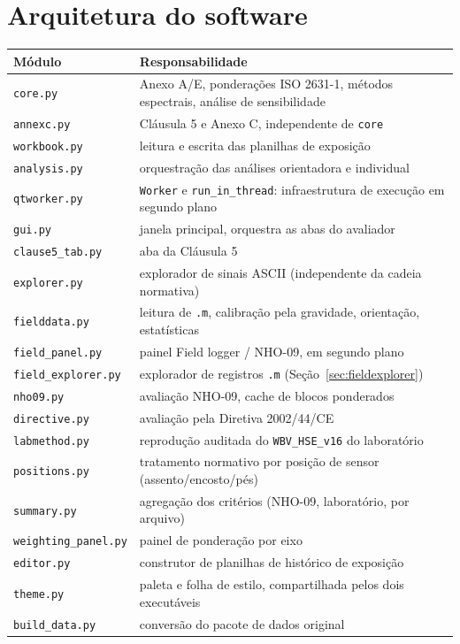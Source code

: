 \documentclass[11pt,a4paper]{article}
\newcommand{\code}[1]{\texttt{\small #1}}
\begin{document}
\section{Arquitetura do software}
\label{sec:arquitetura}

\begin{center}
\small
\begin{tabular}{ll}
\toprule
\textbf{Módulo} & \textbf{Responsabilidade} \\
\midrule
\code{core.py}            & Anexo A/E, ponderações ISO 2631-1, métodos espectrais, análise de sensibilidade \\
\code{annexc.py}          & Cláusula 5 e Anexo C, independente de \code{core} \\
\code{workbook.py}        & leitura e escrita das planilhas de exposição \\
\code{analysis.py}        & orquestração das análises orientadora e individual \\
\code{qtworker.py}        & \code{Worker} e \code{run\_in\_thread}: infraestrutura de execução em segundo plano \\
\code{gui.py}             & janela principal, orquestra as abas do avaliador \\
\code{clause5\_tab.py}    & aba da Cláusula 5 \\
\code{explorer.py}        & explorador de sinais ASCII (independente da cadeia normativa) \\
\code{fielddata.py}       & leitura de \code{.m}, calibração pela gravidade, orientação, estatísticas \\
\code{field\_panel.py}    & painel Field logger / NHO-09, em segundo plano \\
\code{field\_explorer.py} & explorador de registros \code{.m} (Seção~\ref{sec:fieldexplorer}) \\
\code{nho09.py}           & avaliação NHO-09, cache de blocos ponderados \\
\code{directive.py}       & avaliação pela Diretiva 2002/44/CE \\
\code{labmethod.py}       & reprodução auditada do \code{WBV\_HSE\_v16} do laboratório \\
\code{positions.py}       & tratamento normativo por posição de sensor (assento/encosto/pés) \\
\code{summary.py}         & agregação dos critérios (NHO-09, laboratório, por arquivo) \\
\code{weighting\_panel.py}& painel de ponderação por eixo \\
\code{editor.py}          & construtor de planilhas de histórico de exposição \\
\code{theme.py}           & paleta e folha de estilo, compartilhada pelos dois executáveis \\
\code{build\_data.py}     & conversão do pacote de dados original \\
\bottomrule
\end{tabular}
\end{center}
\end{document}
